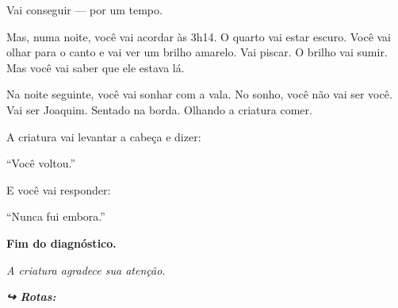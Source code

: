 \noindent Vai conseguir --- por um tempo.

\noindent Mas, numa noite, você vai acordar às 3h14. O quarto vai estar escuro. Você vai olhar para o canto e vai ver um brilho amarelo. Vai piscar. O brilho vai sumir. Mas você vai saber que ele estava lá.

\noindent Na noite seguinte, você vai sonhar com a vala. No sonho, você não vai ser você. Vai ser Joaquim. Sentado na borda. Olhando a criatura comer.

\noindent A criatura vai levantar a cabeça e dizer:

\noindent ``Você voltou.''

\noindent E você vai responder:

\noindent ``Nunca fui embora.''

\noindent \textbf{Fim do diagnóstico.}

\noindent \textit{A criatura agradece sua atenção.}

\noindent\textit{\textbf{↪ Rotas:}  \rotasep {} \rotasep {}}

